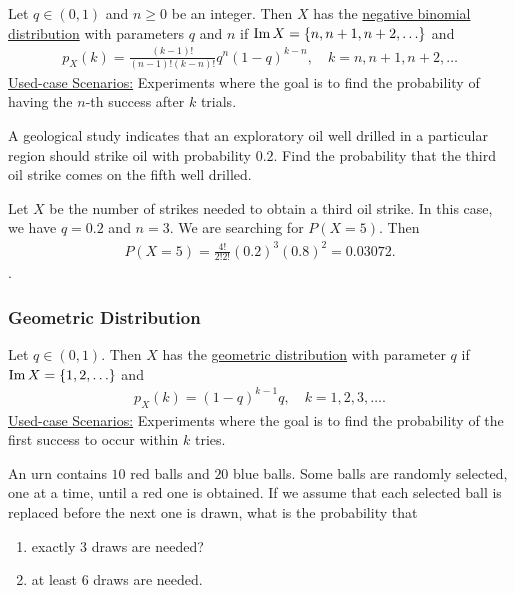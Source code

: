Let $q \in (0, 1)$ and $n \geq 0$ be an integer. Then $X$ has the \underline{negative binomial distribution} with parameters $q$ and $n$ if $\operatorname{Im} X = \{n , n + 1 , n + 2 , \ldots \}$ and
    \begin{align*}
    p_X (k) = \frac{(k-1)!}{(n-1)!(k-n)!} q^{n} (1 - q)^{k - n} , \quad k = n , n + 1 , n + 2, \ldots 
    \end{align*}
\underline{Used-case Scenarios:} Experiments where the goal is to find the probability of having the $n$-th success after $k$ trials.

\begin{example}
A geological study indicates that an exploratory oil well drilled in a particular region should strike oil with probability $0.2$. Find the probability that the third oil strike comes on the fifth well drilled.
\end{example}

\begin{sol*}
Let $X$ be the number of strikes needed to obtain a third oil strike. In this case, we have $q = 0.2$ and $n = 3$. We are searching for $P (X = 5)$. Then
    \begin{align*}
    P (X = 5) = \frac{4!}{2! 2!} (0.2)^3 (0.8)^2 = 0.03072 . \tag*{$\triangle$}
    \end{align*} .
\end{sol*}

\subsubsection*{Geometric Distribution}

Let $q \in (0, 1)$. Then $X$ has the \underline{geometric distribution} with parameter $q$ if $\operatorname{Im} X = \{ 1 , 2, \ldots \}$ and
    \begin{align*}
    p_X (k) = (1 - q)^{k - 1} q , \quad k = 1 , 2, 3, \ldots .
    \end{align*} 
\underline{Used-case Scenarios:} Experiments where the goal is to find the probability of the first success to occur within $k$ tries.

\begin{example}
An urn contains $10$ red balls and $20$ blue balls. Some balls are randomly selected, one at a time, until a red one is obtained. If we assume that each selected ball is replaced before the next one is drawn, what is the probability that
    \begin{enumerate}[label=\alph*)]
    \item exactly $3$ draws are needed?
    \item at least $6$ draws are needed. 
    \end{enumerate}
\end{example}

